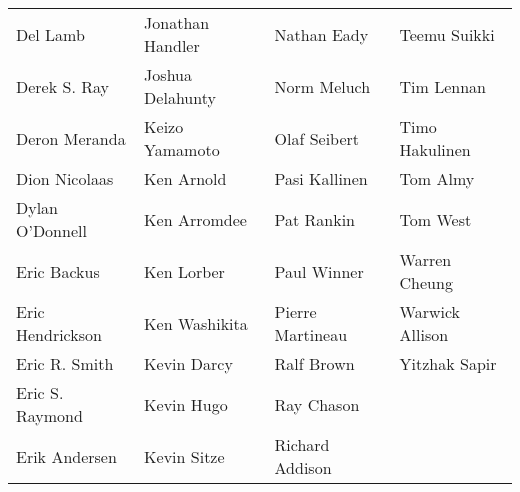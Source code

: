 \begin{center}
\begin{tabular}{llll}
Del Lamb & Jonathan Handler & Nathan Eady & Teemu Suikki\\
Derek S. Ray & Joshua Delahunty & Norm Meluch & Tim Lennan\\
Deron Meranda & Keizo Yamamoto & Olaf Seibert & Timo Hakulinen\\
Dion Nicolaas & Ken Arnold & Pasi Kallinen & Tom Almy\\
Dylan O'Donnell & Ken Arromdee & Pat Rankin & Tom West\\
Eric Backus & Ken Lorber & Paul Winner & Warren Cheung\\
Eric Hendrickson & Ken Washikita & Pierre Martineau & Warwick Allison\\
Eric R. Smith & Kevin Darcy & Ralf Brown & Yitzhak Sapir\\
Eric S. Raymond & Kevin Hugo & Ray Chason\\
Erik Andersen & Kevin Sitze & Richard Addison
\end{tabular}
\end{center}
\clearpage







